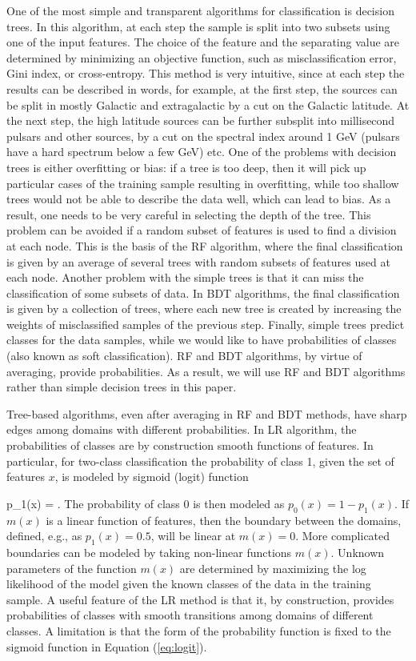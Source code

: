 One of the most simple and transparent algorithms for classification is decision trees.
In this algorithm, at each step the sample is split into two subsets using one of the input features.
The choice of the feature and the separating value are determined by minimizing an objective function, such as misclassification
error, Gini index, or cross-entropy.
This method is very intuitive, since at each step the results can be described in words, 
for example, at the first step, the sources can be split in mostly Galactic and extragalactic by a cut on the Galactic latitude.
At the next step, the high latitude sources can be further subsplit into millisecond pulsars and other sources, by a cut on the spectral index around 1 GeV (pulsars have a hard spectrum below a few GeV) etc.
One of the problems with decision trees is either overfitting or bias: if a tree is too deep, then it will pick up particular cases of the training sample resulting in overfitting, while too shallow trees would not be able to describe the data well, which can lead to bias. 
As a result, one needs to be very careful in selecting the depth of the tree.
This problem can be avoided if a random subset of features is used to find a division at each node. This is the basis of the RF algorithm,
where the final classification is given by an average of several trees with random subsets of features used at each node.
Another problem with the simple trees is that it can miss the classification of some subsets of data. In BDT algorithms, the final classification is given by a collection of trees, where each new tree is created by increasing the weights of misclassified samples of the previous step. 
Finally, simple trees predict classes for the data samples, while we would like to have probabilities of classes (also known as soft classification).
RF and BDT algorithms, by virtue of averaging, provide probabilities. As a result, we will use RF and BDT algorithms rather than simple decision trees in this paper.

Tree-based algorithms, even after averaging in RF and BDT methods, have sharp edges among domains with different probabilities.
In LR algorithm, the probabilities of classes are by construction smooth functions of features.
In particular, for two-class classification the probability of class 1, given the set of features $x$, is modeled by sigmoid (logit) function

\be
{}
p_1(x) = .
\ee
The probability of class 0 is then modeled as $p_0(x) = 1 - p_1(x)$.
If $m(x)$ is a linear function of features, then the boundary between the domains, defined, e.g., as $p_1(x) = 0.5$, will be linear
at $m(x) = 0$.
More complicated boundaries can be modeled by taking non-linear functions $m(x)$.
Unknown parameters of the function $m(x)$ are determined by maximizing the log likelihood of the model given the known classes of the data in the training sample.
A useful feature of the LR method is that it, by construction, provides probabilities of classes with smooth transitions among domains of different classes.
A limitation is that the form of the probability function is fixed to the sigmoid function in Equation (\ref{eq:logit}).

